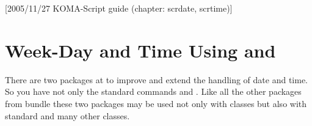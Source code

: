 %
%
%
%
%
%
%
%
% 
%
%
%
%

[{2005/11/27 KOMA-Script guide (chapter:
  scrdate, scrtime)}]

\chapter{Week-Day and Time Using  and }

There are two packages at \KOMAScript{} to improve and extend the
handling of date and time. So you have not
only the standard commands  and . Like all
the other packages from \KOMAScript{} bundle these two packages may be used
not only with \KOMAScript{} classes but also with standard and many
other classes.

